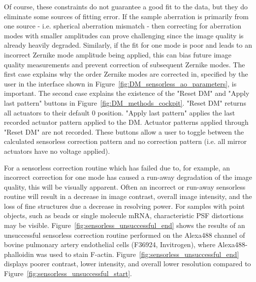 Of course, these constraints do not guarantee a good fit to the data, but 
they do eliminate some sources of fitting error. If the sample aberration is 
primarily from one source - i.e. spherical aberration mismatch - then 
correcting for aberration modes with smaller amplitudes can prove challenging 
since the image quality is already heavily degraded. Similarly, if the fit 
for one mode is poor and leads to an incorrect Zernike mode amplitude being 
applied, this can bias future image quality measurements and prevent 
correction of subsequent Zernike modes. The first case explains why the order 
Zernike modes are corrected in, specified by the user in the interface shown 
in Figure~\ref{fig:DM_sensorless_ao_parameters}, is important. The second 
case explains the existence of the "Reset DM" and "Apply last pattern" 
buttons in Figure~\ref{fig:DM_methods_cockpit}. "Reset DM" returns all 
actuators to their default 0 position. "Apply last pattern" applies the last 
recorded actuator pattern applied to the DM. Actuator patterns applied 
through "Reset DM" are not recorded. These buttons allow a user to toggle 
between the calculated sensorless correction pattern and no correction 
pattern (i.e. all mirror actuators have no voltage applied). 

For a sensorless correction routine which has failed due to, for example, an 
incorrect correction for one mode has caused a run-away degradation of the 
image quality, this will be visually apparent. Often an incorrect or run-away 
sensorless routine will result in a decrease in image contrast, overall image 
intensity, and the loss of fine structures due a decrease in resolving power. 
For samples with point objects, such as beads or single molecule mRNA, 
characteristic PSF distortions may be visible. 
Figure~\ref{fig:sensorless_unsuccessful_end} shows the results of an 
unsuccessful sensorless correction routine performed on the Alexa488 channel 
of bovine pulmonary artery endothelial cells (F36924, Invitrogen), where 
Alexa488-phalloidin was used to stain F-actin. 
Figure~\ref{fig:sensorless_unsuccessful_end} displays poorer contrast, lower 
intensity, and overall lower resolution compared to 
Figure~\ref{fig:sensorless_unsuccessful_start}.

